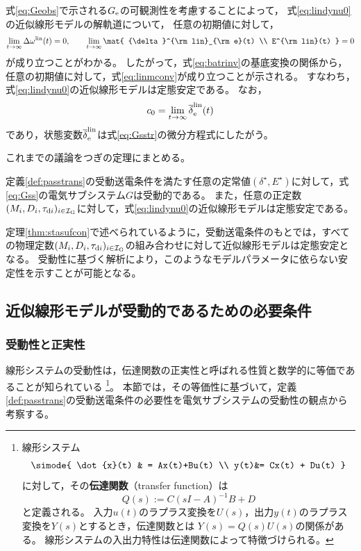 \documentclass[tombow,dvipdfmx]{corona-a5-1.1}
\begin{document}
式\ref{eq:Geobs}で示される$G_{\rm e}$の可観測性を考慮することによって，
式\ref{eq:lindynu0}の近似線形モデルの解軌道について，
任意の初期値に対して，
\begin{align}\label{eq:allzero}
\lim_{t\rightarrow \infty} \Delta \omega^{\rm lin}(t)  =0,\qquad
\lim_{t\rightarrow \infty} \mat{
{\delta}^{\rm lin}_{\rm e}(t)   \\
E^{\rm lin}(t)  
}
 =0
\end{align}
が成り立つことがわかる。
したがって，式\ref{eq:batrinv}の基底変換の関係から，任意の初期値に対して，式\ref{eq:linmconv}が成り立つことが示される。
すなわち，式\ref{eq:lindynu0}の近似線形モデルは定態安定である。
なお，
\[
c_0 = \lim_{t\rightarrow \infty}\overline{\delta}^{\rm lin}_{\rm e}(t)
\]
であり，状態変数$\overline{\delta}^{\rm lin}_{\rm e}$は式\ref{eq:Gsstr}の微分方程式にしたがう。

これまでの議論をつぎの定理にまとめる。

\begin{定理}[受動性に基づく近似線形モデルの定態安定性]\label{thm:stasufcon}
定義\ref{def:passtrans}の受動送電条件を満たす任意の定常値$(\delta^{\star},E^{\star})$に対して，式\ref{eq:Gss}の電気サブシステム$G$は受動的である。
また，任意の正定数$(M_i,D_i,\tau_{{\rm d}i})_{i \in \mathcal{I}_{\rm G}}$に対して，式\ref{eq:lindynu0}の近似線形モデルは定態安定である。
\end{定理}

定理\ref{thm:stasufcon}で述べられているように，受動送電条件のもとでは，すべての物理定数$(M_i,D_i,\tau_{{\rm d}i})_{i \in \mathcal{I}_{\rm G}}$の組み合わせに対して近似線形モデルは定態安定となる。
受動性に基づく解析により，このようなモデルパラメータに依らない安定性を示すことが可能となる。


\begin{例}[基底変換による定態安定性の解析]
\end{例}

\subsection{近似線形モデルが受動的であるための必要条件\advanced}\label{sec:nesconana}

\subsubsection{受動性と正実性}

線形システムの受動性は，伝達関数の正実性と呼ばれる性質と数学的に等価であることが知られている
\footnote{
線形システム
\begin{align*}
\simode{
\dot{x}(t) & = Ax(t)+Bu(t) \\
y(t)&= Cx(t) + Du(t)
}
\end{align*}
に対して，その\textbf{伝達関数}（transfer function）は
\[
Q(s):=C(sI-A)^{-1}B +D
\]
と定義される。
入力$u(t)$のラプラス変換を$U(s)$，出力$y(t)$のラプラス変換を$Y(s)$とするとき，伝達関数とは
$Y(s)=Q(s)U(s)$の関係がある。
線形システムの入出力特性は伝達関数によって特徴づけられる。
}。
本節では，その等価性に基づいて，定義\ref{def:passtrans}の受動送電条件の必要性を電気サブシステムの受動性の観点から考察する。
\end{document}
